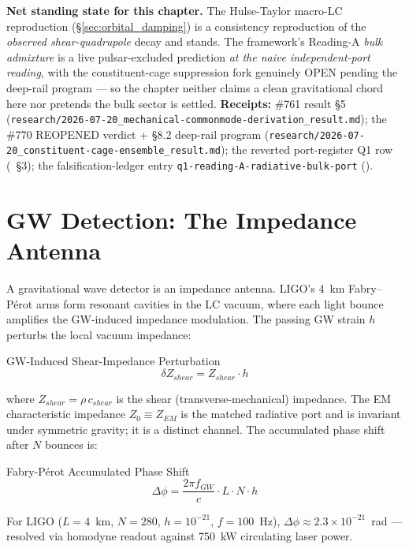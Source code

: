 \begin{warningbox}
\medskip
\noindent\textbf{Net standing state for this chapter.} The Hulse-Taylor macro-LC reproduction
(\S\ref{sec:orbital_damping}) is a consistency reproduction of the \emph{observed shear-quadrupole}
decay and stands. The framework's Reading-A \emph{bulk admixture} is a live pulsar-excluded
prediction \emph{at the naive independent-port reading}, with the constituent-cage suppression fork
genuinely OPEN pending the deep-rail program --- so the chapter neither claims a clean gravitational
chord here nor pretends the bulk sector is settled. \textbf{Receipts:} \#761 result \S5
(\texttt{research/2026-07-20\_mechanical-commonmode-derivation\_result.md}); the \#770 REOPENED
verdict + \S8.2 deep-rail program
(\texttt{research/2026-07-20\_constituent-cage-ensemble\_result.md}); the reverted port-register
Q1 row (~\S3); the falsification-ledger entry
\texttt{q1-reading-A-radiative-bulk-port} ().
\end{warningbox}

\section{GW Detection: The Impedance Antenna}
\label{sec:gw_detection}

A gravitational wave detector is an impedance antenna.  LIGO's 4~km
Fabry--P\'erot arms form resonant cavities in the LC vacuum, where
each light bounce amplifies the GW-induced impedance modulation.
The passing GW strain $h$ perturbs the local vacuum impedance:
\begin{resultbox}{GW-Induced Shear-Impedance Perturbation}
\begin{equation}
    \delta Z_{shear} = Z_{shear} \cdot h
\end{equation}
\end{resultbox}
where $Z_{shear} = \rho\,c_{shear}$ is the shear (transverse-mechanical) impedance. The EM characteristic impedance $Z_0 \equiv Z_{EM}$ is the matched radiative port and is invariant under symmetric gravity; it is a distinct channel.
The accumulated phase shift after $N$ bounces is:
\begin{resultbox}{Fabry-P\'erot Accumulated Phase Shift}
\begin{equation}
    \Delta\phi = \frac{2\pi f_{GW}}{c} \cdot L \cdot N \cdot h
\end{equation}
\end{resultbox}
For LIGO ($L=4$~km, $N=280$, $h=10^{-21}$, $f=100$~Hz),
$\Delta\phi \approx 2.3 \times 10^{-21}$~rad --- resolved via
homodyne readout against 750~kW circulating laser power.

